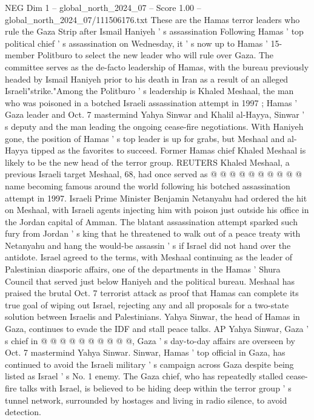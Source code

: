 \begin{textsample}{NEG Dim 1 – global\_north\_2024\_07 – Score 1.00 – global\_north\_2024\_07/111506176.txt}  \label{ex:f1_neg_066}
These are the Hamas terror leaders who rule the Gaza Strip after Ismail Haniyeh ' s assassination Following Hamas ' top political chief ' s assassination on Wednesday, it ' s now up to Hamas ' 15-member Politburo to select the new leader who will rule over Gaza.
The committee serves as the de-facto leadership of Hamas, with the bureau previously headed by Ismail Haniyeh prior to his death in Iran as a result of an alleged Israeli"strike."Among the Politburo ' s leadership is Khaled Meshaal, the man who was poisoned in a botched Israeli assassination attempt in 1997 ; Hamas ' Gaza leader and Oct. 7 mastermind Yahya Sinwar and Khalil al-Hayya, Sinwar ' s deputy and the man leading the ongoing cease-fire negotiations.
With Haniyeh gone, the position of Hamas ' s top leader is up for grabs, but Meshaal and al-Hayya tipped as the favorites to succeed.
Former Hamas chief Khaled Meshaal is likely to be the new head of the terror group.
REUTERS Khaled Meshaal, a previous Israeli target Meshaal, 68, had once served as @ @ @ @ @ @ @ @ @ @ name becoming famous around the world following his botched assassination attempt in 1997.
Israeli Prime Minister Benjamin Netanyahu had ordered the hit on Meshaal, with Israeli agents injecting him with poison just outside his office in the Jordan capital of Amman.
The blatant assassination attempt sparked such fury from Jordan ' s king that he threatened to walk out of a peace treaty with Netanyahu and hang the would-be assassin ' s if Israel did not hand over the antidote.
Israel agreed to the terms, with Meshaal continuing as the leader of Palestinian diasporic affairs, one of the departments in the Hamas ' Shura Council that served just below Haniyeh and the political bureau.
Meshaal has praised the brutal Oct. 7 terrorist attack as proof that Hamas can complete its true goal of wiping out Israel, rejecting any and all proposals for a two-state solution between Israelis and Palestinians.
Yahya Sinwar, the head of Hamas in Gaza, continues to evade the IDF and stall peace talks.
AP Yahya Sinwar, Gaza ' s chief in @ @ @ @ @ @ @ @ @ @, Gaza ' s day-to-day affairs are overseen by Oct. 7 mastermind Yahya Sinwar.
Sinwar, Hamas ' top official in Gaza, has continued to avoid the Israeli military ' s campaign across Gaza despite being listed as Israel ' s No. 1 enemy.
The Gaza chief, who has repeatedly stalled cease-fire talks with Israel, is believed to be hiding deep within the terror group ' s tunnel network, surrounded by hostages and living in radio silence, to avoid detection.

\end{textsample}

